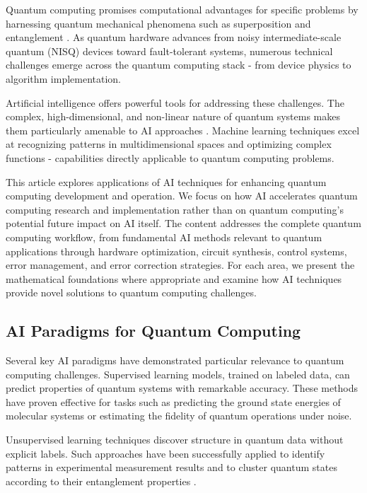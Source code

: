 Quantum computing promises computational advantages for specific problems by harnessing quantum mechanical phenomena such as superposition and entanglement \cite{alexeev2021quantum}. As quantum hardware advances from noisy intermediate-scale quantum (NISQ) devices toward fault-tolerant systems, numerous technical challenges emerge across the quantum computing stack - from device physics to algorithm implementation.

Artificial intelligence offers powerful tools for addressing these challenges. The complex, high-dimensional, and non-linear nature of quantum systems makes them particularly amenable to AI approaches \cite{dunjko2023artificial}. Machine learning techniques excel at recognizing patterns in multidimensional spaces and optimizing complex functions - capabilities directly applicable to quantum computing problems.

This article explores applications of AI techniques for enhancing quantum computing development and operation. We focus on how AI accelerates quantum computing research and implementation rather than on quantum computing's potential future impact on AI itself. The content addresses the complete quantum computing workflow, from fundamental AI methods relevant to quantum applications through hardware optimization, circuit synthesis, control systems, error management, and error correction strategies. For each area, we present the mathematical foundations where appropriate and examine how AI techniques provide novel solutions to quantum computing challenges.

\subsection{AI Paradigms for Quantum Computing}

Several key AI paradigms have demonstrated particular relevance to quantum computing challenges. Supervised learning models, trained on labeled data, can predict properties of quantum systems with remarkable accuracy. These methods have proven effective for tasks such as predicting the ground state energies of molecular systems or estimating the fidelity of quantum operations under noise.

Unsupervised learning techniques discover structure in quantum data without explicit labels. Such approaches have been successfully applied to identify patterns in experimental measurement results and to cluster quantum states according to their entanglement properties \cite{janiesch2021machine}.

